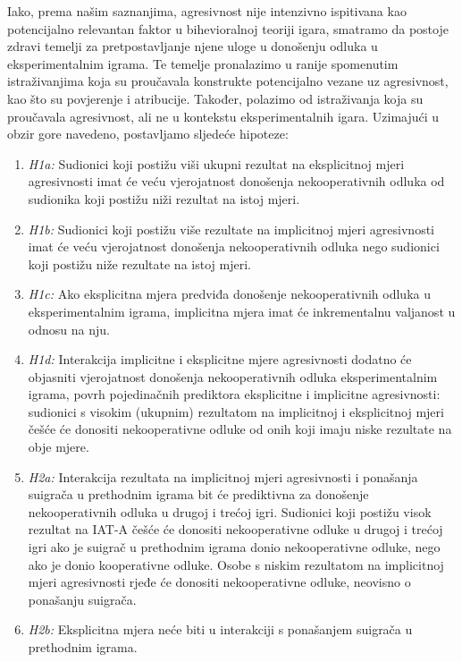 \documentclass[a4paper, 12pt]{report}
\begin{document}
Iako, prema našim saznanjima, agresivnost nije intenzivno ispitivana kao
potencijalno relevantan faktor u bihevioralnoj teoriji igara, smatramo da
postoje zdravi temelji za pretpostavljanje njene uloge u donošenju odluka u
eksperimentalnim igrama. Te temelje pronalazimo u ranije spomenutim
istraživanjima koja su proučavala konstrukte potencijalno vezane uz agresivnost,
kao što su povjerenje i atribucije. Također, polazimo od istraživanja koja su
proučavala agresivnost, ali ne u kontekstu eksperimentalnih igara. Uzimajući u obzir
gore navedeno, postavljamo sljedeće hipoteze:
\begin{enumerate}[label = {}]
        \itemsep0em
        \item \emph{H1a:} Sudionici koji postižu viši ukupni rezultat na eksplicitnoj
            mjeri agresivnosti imat će veću vjerojatnost donošenja nekooperativnih
            odluka od sudionika koji postižu niži rezultat na istoj mjeri.
        \item \emph{H1b:} Sudionici koji postižu više rezultate na implicitnoj
            mjeri agresivnosti imat će veću vjerojatnost donošenja
            nekooperativnih odluka nego sudionici koji postižu niže rezultate na
            istoj mjeri.
        \item \emph{H1c:} Ako eksplicitna mjera predviđa donošenje
            nekooperativnih odluka u eksperimentalnim igrama, implicitna mjera
            imat će inkrementalnu valjanost u odnosu na nju.
        \item \emph{H1d:} Interakcija implicitne i eksplicitne mjere agresivnosti
            dodatno će objasniti vjerojatnost donošenja nekooperativnih odluka
            eksperimentalnim igrama, povrh pojedinačnih prediktora eksplicitne i
            implicitne agresivnosti: sudionici s visokim (ukupnim) rezultatom na
            implicitnoj i eksplicitnoj mjeri češće će donositi nekooperativne
            odluke od onih koji imaju niske rezultate na obje mjere. 
        \item \emph{H2a:} Interakcija rezultata na implicitnoj mjeri agresivnosti
            i ponašanja suigrača u prethodnim igrama bit će prediktivna za
            donošenje nekooperativnih odluka u drugoj i trećoj igri. Sudionici koji postižu visok
            rezultat na IAT-A češće će donositi nekooperativne odluke u drugoj i
            trećoj igri ako je
            suigrač u prethodnim igrama donio nekooperativne odluke, nego ako je
            donio kooperativne odluke. Osobe s niskim rezultatom na implicitnoj
            mjeri agresivnosti
            rjeđe će donositi nekooperativne odluke, neovisno o ponašanju
            suigrača. 
        \item \emph{H2b:} Eksplicitna mjera neće biti u interakciji s ponašanjem
            suigrača u prethodnim igrama.
    \end{enumerate}
\end{document}
